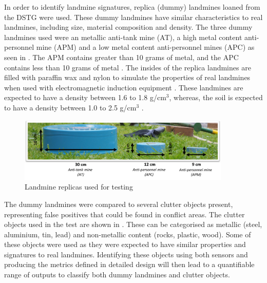 \documentclass[main.tex]{subfiles}
\begin{document}
In order to identify landmine signatures, replica (dummy) landmines loaned from the DSTG were used. These dummy landmines have similar characteristics to real landmines, including size, material composition and density. The three dummy landmines used were an metallic anti-tank mine (AT), a high metal content anti-personnel mine (APM) and a low metal content anti-personnel mines (APC) as seen in . The APM contains greater than 10 grams of metal, and the APC contains less than 10 grams of metal \parencite{chant2005dsto}. The insides of the replica landmines are filled with paraffin wax and nylon to simulate the properties of real landmines when used with electromagnetic induction equipment \parencite{chant2005dsto}. These landmines are expected to have a density between 1.6 to 1.8 g/cm$^3$, whereas, the soil is expected to have a density between 1.0 to 2.5 g/cm$^3$ \parencite{das2002soil}.		
\begin{figure}[ht]
\includegraphics[width=0.9\textwidth]{5-Testing/dummy.PNG}
\centering
\caption{Landmine replicas used for testing }
\end{figure}

The dummy landmines were compared to several clutter objects present, representing false positives that could be found in conflict areas. The clutter objects used in the test are shown in . These can be categorised as metallic (steel, aluminium, tin, lead) and non-metallic content (rocks, plastic, wood). Some of these objects were used as they were expected to have similar properties and signatures to real landmines. Identifying these objects using both sensors and producing the metrics defined in detailed design will then lead to a quantifiable range of outputs to classify both dummy landmines and clutter objects.
\end{document}

